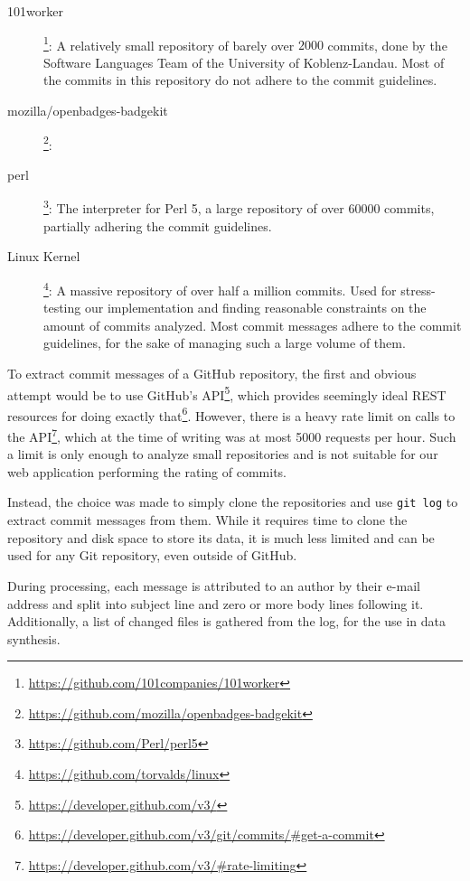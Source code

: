 \begin{description}
    \item[101worker]\footnote{\url{https://github.com/101companies/101worker}}: A relatively small repository of barely over $2000$ commits, done by the Software Languages Team of the University of Koblenz-Landau. Most of the commits in this repository do not adhere to the commit guidelines.
    \item[mozilla/openbadges-badgekit]\footnote{\url{https://github.com/mozilla/openbadges-badgekit}}: %
    \item[perl]\footnote{\url{https://github.com/Perl/perl5}}: The interpreter for Perl 5, a large repository of over $60000$ commits, partially adhering the commit guidelines.
    \item[Linux Kernel]\footnote{\url{https://github.com/torvalds/linux}}: A massive repository of over half a million commits. Used for stress-testing our implementation and finding reasonable constraints on the amount of commits analyzed. Most commit messages adhere to the commit guidelines, for the sake of managing such a large volume of them.
\end{description}

To extract commit messages of a GitHub repository, the first and obvious attempt would be to use GitHub's API\footnote{\url{https://developer.github.com/v3/}}, which provides seemingly ideal REST resources for doing exactly that\footnote{\url{https://developer.github.com/v3/git/commits/\#get-a-commit}}. However, there is a heavy rate limit on calls to the API\footnote{\url{https://developer.github.com/v3/\#rate-limiting}}, which at the time of writing was at most 5000 requests per hour. Such a limit is only enough to analyze small repositories and is not suitable for our web application performing the rating of commits.

Instead, the choice was made to simply clone the repositories and use \texttt{git log} to extract commit messages from them. While it requires time to clone the repository and disk space to store its data, it is much less limited and can be used for any Git repository, even outside of GitHub.

During processing, each message is attributed to an author by their e-mail address and split into subject line and zero or more body lines following it. Additionally, a list of changed files is gathered from the log, for the use in data synthesis.

